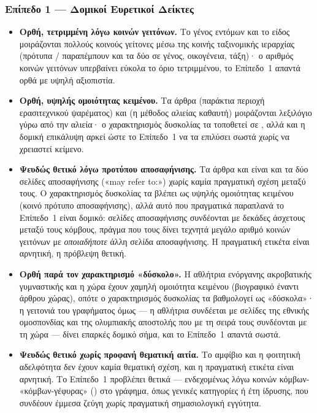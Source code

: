 \subsubsection{Επίπεδο 1 --- Δομικοί Ευρετικοί Δείκτες}

\begin{itemize}
  \item \textbf{Ορθή, τετριμμένη λόγω κοινών γειτόνων.} Το γένος εντόμων
   και το είδος  μοιράζονται πολλούς κοινούς
  γείτονες μέσω της κοινής ταξινομικής ιεραρχίας (πρότυπα /
  παραπέμπουν και τα δύο σε γένος, οικογένεια, τάξη)· ο αριθμός κοινών γειτόνων
  υπερβαίνει εύκολα το όριο τετριμμένου, το Επίπεδο~1 απαντά ορθά με υψηλή
  αξιοπιστία.
  \item \textbf{Ορθή, υψηλής ομοιότητας κειμένου.} Τα άρθρα 
  (παράκτια περιοχή ερασιτεχνικού ψαρέματος) και  (η μέθοδος αλιείας
  καθαυτή) μοιράζονται λεξιλόγιο γύρω από την αλιεία· ο χαρακτηρισμός δυσκολίας
  τα τοποθετεί σε , αλλά και η δομική επικάλυψη αρκεί ώστε
  το Επίπεδο~1 να τα επιλύσει σωστά χωρίς να χρειαστεί κείμενο.
  \item \textbf{Ψευδώς θετικό λόγω προτύπου αποσαφήνισης.} Τα άρθρα  και  είναι και τα δύο σελίδες αποσαφήνισης («may refer
  to:») χωρίς καμία πραγματική σχέση μεταξύ τους.
  Ο χαρακτηρισμός δυσκολίας τα
  βλέπει ως υψηλής ομοιότητας κειμένου (κοινό πρότυπο αποσαφήνισης), αλλά αυτό
  που πραγματικά παραπλανά το Επίπεδο~1 είναι δομικό: σελίδες αποσαφήνισης
  συνδέονται με δεκάδες άσχετους μεταξύ τους κόμβους, πράγμα που τους δίνει
  τεχνητά μεγάλο αριθμό κοινών γειτόνων με \textit{οποιαδήποτε} άλλη σελίδα
  αποσαφήνισης.
  Η πραγματική ετικέτα είναι αρνητική, η πρόβλεψη θετική.
  \item \textbf{Ορθή παρά τον χαρακτηρισμό «δύσκολο».} Η αθλήτρια ενόργανης
  ακροβατικής γυμναστικής  και η χώρα 
  έχουν χαμηλή ομοιότητα κειμένου (βιογραφικό έναντι άρθρου χώρας), οπότε ο
  χαρακτηρισμός δυσκολίας τα βαθμολογεί ως «δύσκολα»· η γειτονιά του γραφήματος όμως
  --- η αθλήτρια συνδέεται με σελίδες της εθνικής ομοσπονδίας και της
  ολυμπιακής αποστολής που με τη σειρά τους συνδέονται με τη χώρα --- δίνει
  επαρκές δομικό σήμα, και το Επίπεδο~1 απαντά σωστά.
  \item \textbf{Ψευδώς θετικό χωρίς προφανή θεματική αιτία.} Το αμφίβιο
   και η φοιτητική αδελφότητα  δεν έχουν καμία θεματική σχέση, και η πραγματική ετικέτα είναι
  αρνητική.
  Το Επίπεδο~1 προβλέπει θετικά --- ενδεχομένως λόγω κοινών κόμβων-
  «κόμβων-γέφυρας» () στο γράφημα, όπως γενικές κατηγορίες ή έτη ίδρυσης,
  που συνδέουν έμμεσα ζεύγη χωρίς πραγματική σημασιολογική εγγύτητα.
\end{itemize}

